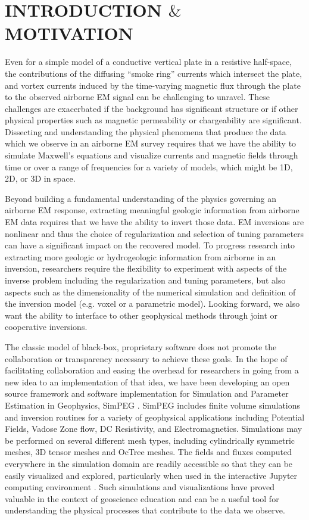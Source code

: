 \documentclass[paper]{geophysics}
\begin{document}
\section{INTRODUCTION $\&$ MOTIVATION}
Even for a simple model of a conductive vertical plate in a resistive half-space, the contributions of the diffusing ``smoke ring'' currents which intersect the plate, and vortex currents induced by the time-varying magnetic flux through the plate to the observed airborne EM signal can be challenging to unravel. These challenges are exacerbated if the background has significant structure or if other physical properties such as magnetic permeability or chargeability are significant. Dissecting and understanding the physical phenomena that produce the data which we observe in an airborne EM survey requires that we have the ability to simulate Maxwell's equations and visualize currents and magnetic fields through time or over a range of frequencies for a variety of models, which might be 1D, 2D, or 3D in space.

Beyond building a fundamental understanding of the physics governing an airborne EM response, extracting meaningful geologic information from airborne EM data requires that we have the ability to invert those data. EM inversions are nonlinear and thus the choice of regularization and selection of tuning parameters can have a significant impact on the recovered model. To progress research into extracting more geologic or hydrogeologic information from airborne in an inversion, researchers require the flexibility to experiment with aspects of the inverse problem including the regularization and tuning parameters, but also aspects such as the dimensionality of the numerical simulation and definition of the inversion model (e.g. voxel or a parametric model). Looking forward, we also want the ability to interface to other geophysical methods through joint or cooperative inversions.

The classic model of black-box, proprietary software does not promote the collaboration or transparency necessary to achieve these goals. In the hope of facilitating collaboration and easing the overhead for researchers in going from a new idea to an implementation of that idea, we have been developing an open source framework and software implementation for Simulation and Parameter Estimation in Geophysics, SimPEG \citep{cockett2015}. SimPEG includes finite volume simulations and inversion routines for a variety of geophysical applications including Potential Fields, Vadose Zone flow, DC Resistivity, and Electromagnetics. Simulations may be performed on several different mesh types, including cylindrically symmetric meshes, 3D tensor meshes and OcTree meshes. The fields and fluxes computed everywhere in the simulation domain are readily accessible so that they can be easily visualized and explored, particularly when used in the interactive Jupyter computing environment \citep{Perez2015}. Such simulations and visualizations have proved valuable in the context of geoscience education \citep{Oldenburg2017} and can be a useful tool for understanding the physical processes that contribute to the data we observe.
\end{document}
